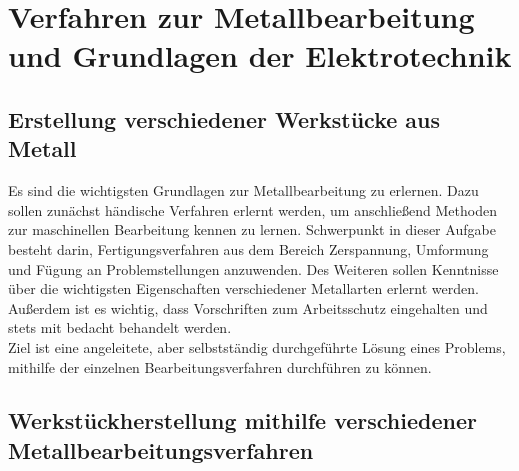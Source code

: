 \chapter{Verfahren zur Metallbearbeitung und Grundlagen der Elektrotechnik}
\label{cha:Metallbearbeitung und Elektrotechnik}

\section{Erstellung verschiedener Werkstücke aus Metall}

Es sind die wichtigsten Grundlagen zur Metallbearbeitung zu erlernen. Dazu sollen zunächst händische Verfahren erlernt werden, um anschließend Methoden 
zur maschinellen Bearbeitung kennen zu lernen. Schwerpunkt in dieser Aufgabe besteht darin, Fertigungsverfahren aus dem Bereich Zerspannung, Umformung 
und Fügung an Problemstellungen anzuwenden. Des Weiteren sollen Kenntnisse über die wichtigsten Eigenschaften verschiedener Metallarten erlernt werden. 
Außerdem ist es wichtig, dass Vorschriften zum Arbeitsschutz eingehalten und stets mit bedacht behandelt werden. 
\\
Ziel ist eine angeleitete, aber selbstständig durchgeführte Lösung eines Problems, mithilfe der einzelnen Bearbeitungsverfahren durchführen zu können. 
\clearpage

\section{Werkstückherstellung mithilfe verschiedener Metallbearbeitungsverfahren}


